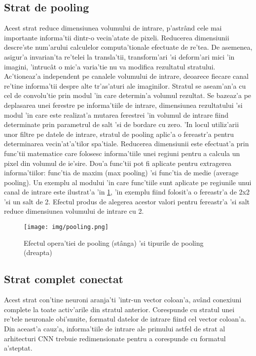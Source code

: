 \documentclass[12pt,a4paper,twoside]{report}
\begin{document}
\subsection{Strat de pooling}
Acest strat reduce dimensiunea volumului de intrare, p'astr\^and cele mai importante informa'tii dintr-o vecin'atate de pixeli. Reducerea dimensiunii descre'ste num'arului calculelor computa'tionale efectuate de re'tea. De asemenea, asigur'a invarian'ta re'telei la transla'tii, transform'ari 'si deform'ari mici 'in imagini, 'intruc\^at o mic'a varia'tie nu va modifica rezultatul stratului. Ac'tioneaz'a independent pe canalele volumului de intrare, deoarece fiecare canal re'tine informa'tii despre alte tr'as'aturi ale imaginilor. Stratul se aseam'an'a cu cel de convolu'tie prin modul 'in care determin'a volumul rezultat. Se bazeaz'a pe deplasarea unei ferestre pe informa'tiile de intrare, dimensiunea rezultatului 'si modul 'in care este realizat'a mutarea ferestrei 'in volumul de intrare fiind determinate prin parametrul de salt 'si de bordare cu zero. 'In locul utiliz'arii unor filtre pe datele de intrare, stratul de pooling aplic'a o fereastr'a pentru determinarea vecin'at'a'tilor spa'tiale. Reducerea dimensiunii este efectuat'a prin func'tii matematice care folosesc informa'tiile unei regiuni pentru a calcula un pixel din volumul de ie'sire. Dou'a func'tii pot fi aplicate pentru extragerea informa'tiilor: func'tia de maxim (max pooling) 'si func'tia de medie (average pooling). Un exemplu al modului 'in care func'tiile sunt aplicate pe regiunile unui canal de intrare este ilustrat'a 'in \ref{fig:maxpooling}, 'in exemplu fiind folosit'a o fereastr'a de 2x2 'si un salt de 2. Efectul produs de alegerea acestor valori pentru fereastr'a 'si salt reduce dimensiunea volumului de intrare cu 2.

\begin{figure}[H]
  \texttt{[image: img/pooling.png]}
  \centering
  \caption{Efectul opera'tiei de pooling (st\^anga) 'si tipurile de pooling (dreapta) \protect\footnotemark}
  \label{fig:maxpooling}
\end{figure}

\subsection{Strat complet conectat}
Acest strat con'tine neuroni aranja'ti 'intr-un vector coloan'a, av\^and conexiuni complete la toate activ'arile din stratul anterior. Corespunde cu stratul unei re'tele neuronale obi'snuite, formatul datelor de intrare fiind cel vector coloan'a. Din aceast'a cauz'a, informa'tiile de intrare ale primului astfel de strat al arhitecturi CNN trebuie redimensionate pentru a corespunde cu formatul a'steptat.
\end{document}
